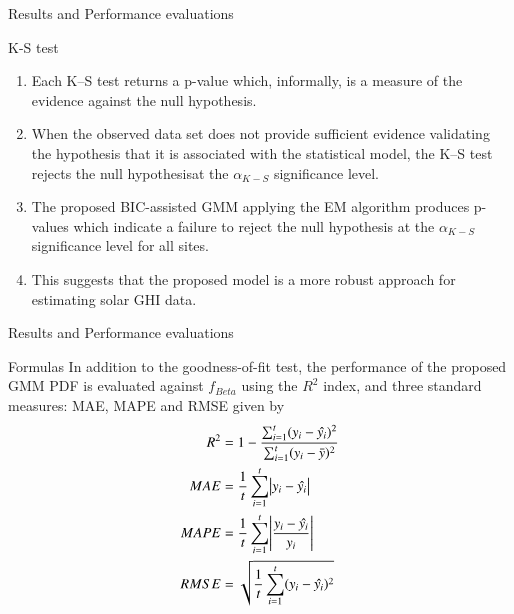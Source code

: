 \documentclass{beamer}
\begin{document}
\begin{frame}{Results and Performance evaluations }
    \begin{block}{K-S test}
    \begin{enumerate}
        \item  Each K–S test returns a p-value which, informally, is a measure of the evidence against the null hypothesis.
        \item When the observed data set does not provide sufficient evidence validating the hypothesis that it is associated with the statistical model, the K–S test rejects the null hypothesisat the $ \alpha_{K-S}$ significance level.
        \item The proposed BIC-assisted GMM applying the EM algorithm produces p-values which indicate a failure to reject the null hypothesis at the $ \alpha_{K-S}$ significance level for all sites.
\item This suggests that the proposed model is a more robust approach for estimating solar GHI data.
    \end{enumerate}
    \end{block}
\end{frame}
\begin{frame}{Results and Performance evaluations }
    \begin{block}{Formulas}
    In addition to the goodness-of-fit test, the performance of the proposed GMM PDF is evaluated against $f_{Beta}$ using the $R^2$ index, and three standard measures: MAE, MAPE and RMSE given by
\begin{align}
    R^2 &= 1- \dfrac{\sum_{i=1}^{t}(y_i-\hat{y_i})^2}{\sum_{i=1}^{t}(y_i-\Bar{y})^2} \\
    MAE &= \dfrac{1}{t} \sum_{i=1}^{t}\abs{y_i-\hat{y_i}}\\
    MAPE &= \dfrac{1}{t} \sum_{i=1}^{t} \abs{\dfrac{y_i-\hat{y_i}}{y_i}}\\
    RMSE &= \sqrt{ \dfrac{1}{t} \sum_{i=1}^{t} (y_i-\hat{y_i})^2}
\end{align}    
    \end{block}
\end{frame}
\end{document}

